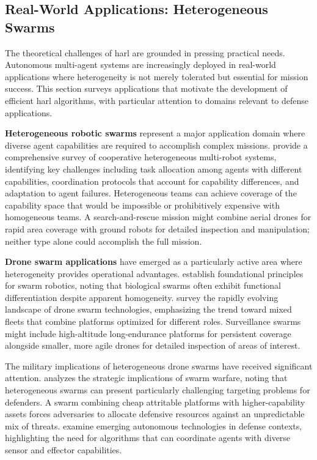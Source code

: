 \subsection{Real-World Applications: Heterogeneous Swarms}
\label{subsec:real-world-applications}

The theoretical challenges of \gls{harl} are grounded in pressing practical needs. 
Autonomous multi-agent systems are increasingly deployed in real-world applications 
where heterogeneity is not merely tolerated but essential for mission success. 
This section surveys applications that motivate the development of 
efficient \gls{harl} algorithms, with particular attention to domains 
relevant to defense applications.

\textbf{Heterogeneous robotic swarms} represent a major application domain 
where diverse agent capabilities are required to accomplish complex missions. 
\cite{rizk2019} provide a comprehensive survey of cooperative 
heterogeneous multi-robot systems, identifying key challenges 
including task allocation among agents with different capabilities, 
coordination protocols that account for capability differences, 
and adaptation to agent failures. Heterogeneous teams can achieve 
coverage of the capability space that would be impossible or 
prohibitively expensive with homogeneous teams. 
A search-and-rescue mission might combine aerial drones for rapid area 
coverage with ground robots for detailed inspection and manipulation; 
neither type alone could accomplish the full mission.

\textbf{Drone swarm applications} have emerged as a particularly 
active area where heterogeneity provides operational advantages. 
\cite{brambilla2013} establish foundational principles for swarm robotics, 
noting that biological swarms often exhibit functional 
differentiation despite apparent homogeneity. \cite{hoang2023} 
survey the rapidly evolving landscape of drone swarm technologies, 
emphasizing the trend toward mixed fleets that combine platforms 
optimized for different roles. 
Surveillance swarms might include high-altitude long-endurance 
platforms for persistent coverage alongside smaller, 
more agile drones for detailed inspection of areas of interest.

The military implications of heterogeneous drone swarms have 
received significant attention. \cite{kallenborn2024} analyzes 
the strategic implications of swarm warfare, 
noting that heterogeneous swarms can present particularly 
challenging targeting problems for defenders. 
A swarm combining cheap attritable platforms with higher-capability 
assets forces adversaries to allocate defensive resources against 
an unpredictable mix of threats. 
\cite{gerstein2024} examine emerging autonomous technologies in 
defense contexts, highlighting the need for algorithms that can 
coordinate agents with diverse sensor and effector capabilities.

